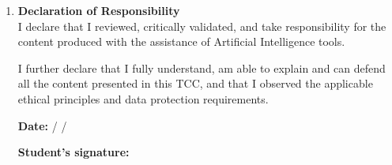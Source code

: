 \begin{enumerate}
\vspace{0.4cm}
\vspace{0.12cm}
\noindent\checkbox\hspace{0.12cm}Safeguards adopted: \formline{10.7cm}

\vspace{0.42cm}
\formline{15.25cm}

\vspace{0.60cm}
When the study involves the \textbf{collection, use or analysis of personal data}, even if publicly available, authors must also indicate the measures adopted to protect personal data, in accordance with Brazil's \textbf{General Data Protection Law} -- LGPD (Law N$^\circ$ 13.709/2018), describing, where relevant, the safeguards adopted in handling such data, such as anonymization or pseudonymization procedures and measures related to the storage, access and security of the information. Images of minors or vulnerable individuals must be removed or properly anonymized in the text.

\vspace{0.38cm}
\vspace{0.12cm}
\noindent\checkbox\hspace{0.12cm}Measures adopted: \formline{10.65cm}

\vspace{0.42cm}
\formline{15.25cm}

\vspace*{0.45cm}
\item \textbf{Declaration of Responsibility}\\

I declare that I reviewed, critically validated, and take responsibility for the content produced with the assistance of Artificial Intelligence tools.

\vspace{0.55cm}
I further declare that I fully understand, am able to explain and can defend all the content presented in this TCC, and that I observed the applicable ethical principles and data protection requirements.

\vspace{1.0cm}
\textbf{Date:} \formline{0.85cm} / \formline{0.85cm} / \formline{1.5cm}

\vspace{0.55cm}
\textbf{Student's signature:} \formline{7.9cm}
\end{enumerate}
